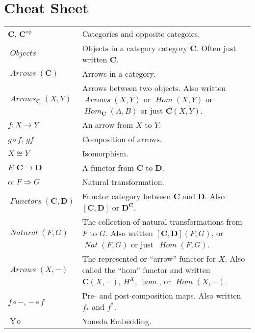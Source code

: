 \documentclass[12pt]{article}
\theoremstyle{definition}
\theoremstyle{definition}
\theoremstyle{definition}
\numberwithin{equation}{section}
\newcommand{\op}{\mathrm{op}}           %
\newcommand{\cat}[1]{\mathbf{#1}}      %
\newcommand{\CC}{\cat{C}}
\newcommand{\DD}{\cat{D}}
\DeclareMathOperator{\Arrows}{\mathit{Arrows}}
\DeclareMathOperator{\Objects}{\mathit{Objects}}
\DeclareMathOperator{\Hom}{\mathit{Hom}}
\DeclareMathOperator{\Nat}{\mathit{Natural}}
\DeclareMathOperator{\Fun}{\mathit{Functors}}
\newcommand{\iso}{\cong}                %
\newcommand{\yo}{\mathop{Y\!o}}
\newcommand{\fto}{\Rightarrow}
\begin{document}
\section{Cheat Sheet}
\small
\renewcommand{\arraystretch}{1.1}
\begin{tabularx}{.9\linewidth}{l X}
$\CC$, $\CC^\op$ & Categories and opposite categoies. \\
$\Objects$ & Objects in a category category $\CC$. Often just written $\CC$.\\
$\Arrows(\CC)$ & Arrows in a category. \\
$\Arrows_\CC(X,Y)$ & Arrows between two objects.  Also written $\Arrows(X,Y)$ or
$\Hom(X,Y)$ or $\Hom_\CC(A, B)$ or just $\CC(X,Y)$. \\
$f: X \to Y$ & An arrow from $X$ to $Y$.\\
$g \circ f$, $gf$ & Composition of arrows.\\
$X \iso Y$ & Isomorphism.\\
$F:\CC \to\DD$ & A functor from $\CC$ to $\DD$.\\
$\alpha: F \fto G$ & Natural transformation.\\
$\Fun(\CC, \DD)$ & Functor category between $\CC$ and $\DD$. Also $[\CC,\DD]$ or
$\DD^\CC$.\\
$\Nat(F, G)$ & The collection of natural transformations from $F$ to $G$. Also written
$[\CC,\DD](F,G)$, or~$\mathop{\mathit {Nat}}(F,G)$ or just~$\Hom(F,G)$. \\
$\Arrows(X, -)$ & The represented or ``arrow'' functor for $X$. Also called the ``hom''
functor and written $\CC(X,-)$, $H^X$, $\mathop{\mathit{hom}}$, or $\Hom(X,-)$. \\
$f \circ - $, $- \circ f$ & Pre- and post-composition maps. Also written $f_*$ and
$f^*$.\\
$\yo$ & Yoneda Embedding.\\
\end{tabularx}

\normalsize
\end{document}
